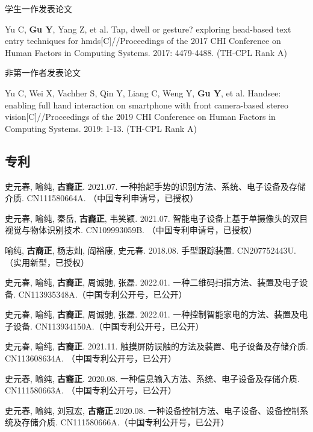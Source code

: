 \begin{resume}
学生一作发表论文

\begin{achievements}
	\item Yu C, \textbf{Gu Y}, Yang Z, et al. Tap, dwell or gesture? exploring head-based text entry techniques for hmds[C]//Proceedings of the 2017 CHI Conference on Human Factors in Computing Systems. 2017: 4479-4488. (TH-CPL Rank A)
\end{achievements}

非第一作者发表论文

\begin{achievements}
	\item Yu C, Wei X, Vachher S, Qin Y, Liang C, Weng Y, \textbf{Gu Y}, et al. Handsee: enabling full hand interaction on smartphone with front camera-based stereo vision[C]//Proceedings of the 2019 CHI Conference on Human Factors in Computing Systems. 2019: 1-13. (TH-CPL Rank A)
\end{achievements}

\subsection*{专利}

\begin{achievements}
\item 史元春, 喻纯, \textbf{古裔正}. 2021.07. 一种抬起手势的识别方法、系统、电子设备及存储介质. CN111580664A. （中国专利申请号，已授权）
\item 史元春, 喻纯, 秦岳, \textbf{古裔正}, 韦笑颖. 2021.07. 智能电子设备上基于单摄像头的双目视觉与物体识别技术. CN109993059B. （中国专利申请号，已授权）
\item 喻纯, \textbf{古裔正}, 杨志灿, 阎裕康, 史元春. 2018.08. 手型跟踪装置. CN207752443U. （实用新型，已授权）
\item 史元春, 喻纯, \textbf{古裔正}, 周诚驰, 张磊. 2022.01. 一种二维码扫描方法、装置及电子设备. CN113935348A.（中国专利公开号，已公开）
\item 史元春, 喻纯, \textbf{古裔正}, 周诚驰, 张磊. 2022.01. 一种控制智能家电的方法、装置及电子设备. CN113934150A.（中国专利公开号，已公开）
\item 史元春, 喻纯, \textbf{古裔正}. 2021.11. 触摸屏防误触的方法及装置、电子设备及存储介质. CN113608634A. （中国专利公开号，已公开）
\item 史元春, 喻纯, \textbf{古裔正}. 2020.08. 一种信息输入方法、系统、电子设备及存储介质. CN111580663A. （中国专利公开号，已公开）
\item 史元春, 喻纯, 刘冠宏, \textbf{古裔正}.2020.08. 一种设备控制方法、电子设备、设备控制系统及存储介质. CN111580666A.（中国专利公开号，已公开）
\end{achievements}

\end{resume}
